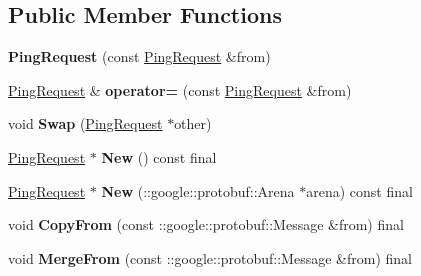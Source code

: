\subsection*{Public Member Functions}
\begin{DoxyCompactItemize}
\item 
\mbox{\label{classcoappbrpc_1_1api_1_1PingRequest_a30f3255dfa8fc0e5135490461c1af728}} 
{\bfseries Ping\+Request} (const \hyperlink{classcoappbrpc_1_1api_1_1PingRequest}{Ping\+Request} \&from)
\item 
\mbox{\label{classcoappbrpc_1_1api_1_1PingRequest_a9fea8caedf2419a70210aa1953526cd1}} 
\hyperlink{classcoappbrpc_1_1api_1_1PingRequest}{Ping\+Request} \& {\bfseries operator=} (const \hyperlink{classcoappbrpc_1_1api_1_1PingRequest}{Ping\+Request} \&from)
\item 
\mbox{\label{classcoappbrpc_1_1api_1_1PingRequest_af756d05276d74ff2c3b324b1e0b38940}} 
void {\bfseries Swap} (\hyperlink{classcoappbrpc_1_1api_1_1PingRequest}{Ping\+Request} $\ast$other)
\item 
\mbox{\label{classcoappbrpc_1_1api_1_1PingRequest_a871778bc2661c885172a53ef56819d86}} 
\hyperlink{classcoappbrpc_1_1api_1_1PingRequest}{Ping\+Request} $\ast$ {\bfseries New} () const final
\item 
\mbox{\label{classcoappbrpc_1_1api_1_1PingRequest_a24ecee4aa9edb3d40aae8fc2a13a4322}} 
\hyperlink{classcoappbrpc_1_1api_1_1PingRequest}{Ping\+Request} $\ast$ {\bfseries New} (\+::google\+::protobuf\+::\+Arena $\ast$arena) const final
\item 
\mbox{\label{classcoappbrpc_1_1api_1_1PingRequest_a63f8978e82082a628f58dda8fce6331a}} 
void {\bfseries Copy\+From} (const \+::google\+::protobuf\+::\+Message \&from) final
\item 
\mbox{\label{classcoappbrpc_1_1api_1_1PingRequest_aa590a22947bbfc9089e9de05a0097ba1}} 
void {\bfseries Merge\+From} (const \+::google\+::protobuf\+::\+Message \&from) final
\item 

\end{DoxyCompactItemize}
